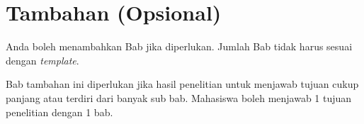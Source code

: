 \chapter{Tambahan (Opsional)}

Anda boleh menambahkan Bab jika diperlukan. Jumlah Bab tidak harus sesuai dengan \textit{template}. 

Bab tambahan ini diperlukan jika hasil penelitian untuk menjawab tujuan cukup panjang atau terdiri dari banyak sub bab. Mahasiswa boleh menjawab 1 tujuan penelitian dengan 1 bab.
